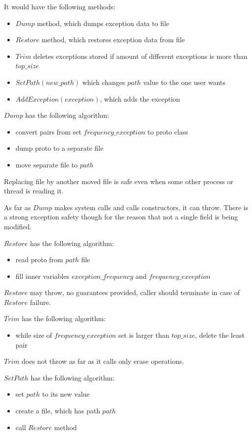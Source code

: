 \documentclass{article}
\begin{document}
It would have the following methods:
\begin{itemize}
	\item $Dump$ method, which dumps exception data to file
	\item $Restore$ method, which restores exception data from file
	\item $Trim$ deletes exceptions stored if amount of different exceptions is more than $top\_size$
	\item $SetPath(new\_path)$ which changes $path$ value to the one user wants
	\item $AddException(exception)$, which adds the exception
\end{itemize}

$Dump$ has the following algorithm:
\begin{itemize}
	\item convert pairs from set $frequency\_exception$ to proto class
	\item dump proto to a separate file
	\item move separate file to $path$
\end{itemize}

Replacing file by another moved file is safe even when some other process or thread is reading it.

As far as $Dump$ makes system calls and calls constructors, it can throw. There is a strong exception safety though for the reason that not a single field is being modified.

$Restore$ has the following algorithm:
\begin{itemize}
	\item read proto from $path$ file
	\item fill inner variables $exception\_frequency$ and $frequency\_exception$
\end{itemize}

$Restore$ may throw, no guarantees provided, caller should terminate in case of $Restore$ failure.

$Trim$ has the following algorithm:
\begin{itemize}
	\item while size of $frequency\_exception$ set is larger than $top\_size$, delete the least pair
\end{itemize}

$Trim$ does not throw as far as it calls only erase operations.

$SetPath$ has the following algorithm:
\begin{itemize}
	\item set $path$ to its new value
	\item create a file, which has path $path$
	\item call $Restore$ method
\end{itemize}
\end{document}
